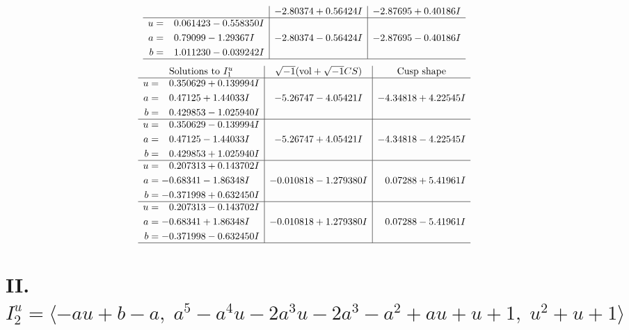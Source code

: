 \documentclass[1p]{elsarticle_modified}
\theoremstyle{definition}
\newcommand{\I}{\sqrt{-1}}
\begin{document}
$$\begin{array}{c|c|c}
 & -2.80374 + 0.56424 I & -2.87695 + 0.40186 I \\ \hline\begin{aligned}
u &= \phantom{-}0.061423 - 0.558350 I \\
a &= \phantom{-}0.79099 - 1.29367 I \\
b &= \phantom{-}1.011230 - 0.039242 I\end{aligned}
 & -2.80374 - 0.56424 I & -2.87695 - 0.40186 I\\
 \hline 
 \end{array}$$\newpage$$\begin{array}{c|c|c}  
\text{Solutions to }I^u_{1}& \I (\text{vol} + \sqrt{-1}CS) & \text{Cusp shape}\\
 \hline 
\begin{aligned}
u &= \phantom{-}0.350629 + 0.139994 I \\
a &= \phantom{-}0.47125 + 1.44033 I \\
b &= \phantom{-}0.429853 - 1.025940 I\end{aligned}
 & -5.26747 - 4.05421 I & -4.34818 + 4.22545 I \\ \hline\begin{aligned}
u &= \phantom{-}0.350629 - 0.139994 I \\
a &= \phantom{-}0.47125 - 1.44033 I \\
b &= \phantom{-}0.429853 + 1.025940 I\end{aligned}
 & -5.26747 + 4.05421 I & -4.34818 - 4.22545 I \\ \hline\begin{aligned}
u &= \phantom{-}0.207313 + 0.143702 I \\
a &= -0.68341 - 1.86348 I \\
b &= -0.371998 + 0.632450 I\end{aligned}
 & -0.010818 - 1.279380 I & \phantom{-}0.07288 + 5.41961 I \\ \hline\begin{aligned}
u &= \phantom{-}0.207313 - 0.143702 I \\
a &= -0.68341 + 1.86348 I \\
b &= -0.371998 - 0.632450 I\end{aligned}
 & -0.010818 + 1.279380 I & \phantom{-}0.07288 - 5.41961 I\\
 \hline 
 \end{array}$$\newpage\newpage\renewcommand{\arraystretch}{1}
\centering \section*{II. $I^u_{2}= \langle - a u+b- a,\;a^5- a^4 u-2 a^3 u-2 a^3- a^2+a u+u+1,\;u^2+u+1 \rangle$}
\end{document}
